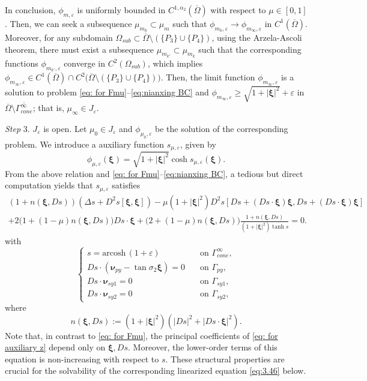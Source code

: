 \documentclass[reqno,12pt]{amsart}
\numberwithin{equation}{section}
\begin{document}
In conclusion, $\phi_{m,\varepsilon}$ is uniformly bounded in $C^{1,\alpha_2}(\overline{\Omega})$ with respect to $\mu\in[0,1]$. Then, we can seek a subsequence $\mu_{m_{k}}\subset\mu_{m}$ such that $\phi_{m_{k},\varepsilon}\to\phi_{m_{\infty},\varepsilon}$ in $C^{1}(\overline{\Omega})$. Moreover, for any subdomain $\Omega_{sub}\subset\overline{\Omega}\setminus(\{P_3\}\cup\{P_4\})$, using the Arzela-Ascoli theorem, there must exist a subsequence $\mu_{m_{k'}}\subset\mu_{m_k}$ such that the corresponding functions $\phi_{m_{k'},\varepsilon}$ converge in $C^2(\Omega_{sub})$, which implies $\phi_{m_\infty,\varepsilon}\in C^1(\overline{\Omega})\cap C^2\big(\overline{\Omega}\setminus(\{P_3\}\cup\{P_4\})\big)$. Then, the limit function $\phi_{m_{\infty},\varepsilon}$ is a solution to problem \eqref{eq: for Fmu}--\eqref{eq:nianxing BC} and $\phi_{m_{\infty},\varepsilon}\geq \sqrt{1+|\bm{\xi}|^2}+\varepsilon$ in $\overline{\Omega}\setminus\overline{\Gamma_{cone}^{\infty}}$; that is, $\mu_{\infty}\in J_{\varepsilon}$.

\textit{Step} 3. $J_{\varepsilon}$ is open. Let $\mu_{0}\in J_{\varepsilon}$ and $\phi_{\mu_{0},\varepsilon}$ be the solution of the corresponding problem. We introduce a auxiliary function $s_{\mu,\varepsilon}$, given by 
	\begin{equation}\label{eq: for tran. z}
		{\phi}_{\mu,\varepsilon}(\bm{\xi})=\sqrt{1+|\bm{\xi}|^{2}}\cosh s_{\mu,\varepsilon}(\bm{\xi}).
	\end{equation}
From the above relation and \eqref{eq: for Fmu}--\eqref{eq:nianxing BC}, a tedious but direct computation yields that $s_{\mu,\varepsilon}$ satisfies
\begin{multline}\label{eq: for auxiliary z}
	(1+n(\bm{\xi},Ds))(\Delta s+D^{2}s[\bm{\xi},\bm{\xi}])-\mu(1+|\bm{\xi}|^{2})D^{2}s[Ds+(Ds\cdot\bm{\xi})\bm{\xi},Ds+(Ds\cdot\bm{\xi})\bm{\xi}]\\
	+2\Big(1+(1-\mu)n(\bm{\xi},Ds)\Big)Ds\cdot\bm{\xi}+\Big(2+(1-\mu)n(\bm{\xi},Ds)\Big)\frac{1+n(\bm{\xi},Ds)}{(1+|\bm{\xi}|^{2})\tanh s}=0.
\end{multline}
with
\begin{equation*}\label{eq:b c for auxiliary z}
    \begin{cases}
      s=\text{arcosh}\, (1+\varepsilon) \quad&\text{on $\Gamma_{cone}^{\infty}$},\\ 
      Ds\cdot(\bm{\nu}_{py}-\tan\sigma_2\bm{\xi})=0\quad&\text{on $\Gamma_{py}$},\\
      Ds\cdot\bm{\nu}_{sy1}=0\quad&\text{on $\Gamma_{sy1}$},\\
      Ds\cdot\bm{\nu}_{sy2}=0\quad&\text{on $\Gamma_{sy2}$},
    \end{cases}
\end{equation*}
where
\begin{equation*}
	n(\bm{\xi},Ds):=(1+|\bm{\xi}|^2)(|Ds|^2+|Ds\cdot\bm{\xi}|^2).
\end{equation*}
Note that, in contrast to \eqref{eq: for Fmu}, the principal coefficients of \eqref{eq: for auxiliary z} depend only on $\bm{\xi},Ds$. Moreover, the lower-order terms of this equation is non-increasing with respect to $s$. These structural properties are crucial for the solvability of the corresponding linearized equation \eqref{eq:3.46} below.
    
\end{document}
